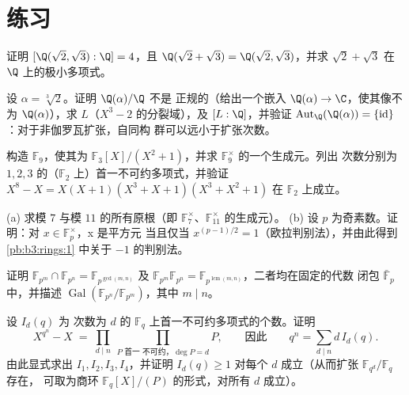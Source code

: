 \section{练习}

\begin{exercise}[$\star$]\label{exo:b3:galois:1}
证明 $[\Q(\sqrt2, \sqrt3):\Q] = 4$，且 $\Q(\sqrt2 + \sqrt3) =
\Q(\sqrt2, \sqrt3)$，并求
$\sqrt2 + \sqrt3$ 在 $\Q$ 上的极小多项式。
\end{exercise}

\begin{exercise}[$\star$]\label{exo:b3:galois:2}
设 $\alpha = \sqrt[3]2$。证明 $\Q(\alpha)/\Q$ 不是
正规的（给出一个嵌入 $\Q(\alpha) \to \C$，使其像不为
$\Q(\alpha)$），求 $L$（$X^3 -
2$ 的分裂域），及 $[L:\Q]$，并验证 $\operatorname{Aut}_\Q(\Q(\alpha)) =
\{\mathrm{id}\}$：对于非伽罗瓦扩张，自同构
群可以远小于扩张次数。
\end{exercise}

\begin{exercise}[$\star$]\label{exo:b3:galois:3}
构造 $\mathbb F_9$，使其为 $\mathbb F_3[X]/(X^2+1)$，并求
$\mathbb F_9^\times$ 的一个生成元。列出
次数分别为 $1, 2, 3$ 的（$\mathbb F_2$ 上）首一不可约多项式，并验证
$X^8 - X = X(X+1)(X^3+X+1)(X^3+X^2+1)$ 在 $\mathbb F_2$ 上成立。
\end{exercise}

\begin{exercise}[$\star\star$]\label{exo:b3:galois:4}
(a) 求模 $7$ 与模 $11$ 的所有原根（即
$\mathbb F_7^\times$、$\mathbb F_{11}^\times$ 的生成元）。
(b) 设 $p$ 为奇素数。证明：对 $x \in \mathbb F_p^\times$，x 是平方元
当且仅当 $x^{(p-1)/2} = 1$（欧拉判别法），并由此得到
\cref{pb:b3:rings:1} 中关于 $-1$ 的判别法。
\end{exercise}

\begin{exercise}[$\star\star$]\label{exo:b3:galois:5}
证明 $\mathbb F_{p^m} \cap \mathbb F_{p^n} = \mathbb
F_{p^{\gcd(m,n)}}$ 及 $\mathbb F_{p^m}\mathbb F_{p^n} = \mathbb
F_{p^{\operatorname{lcm}(m,n)}}$，二者均在固定的代数
闭包 $\bar{\mathbb F}_p$ 中，并描述
$\operatorname{Gal}(\mathbb F_{p^n}/\mathbb F_{p^m})$，其中 $m
\mid n$。
\end{exercise}

\begin{exercise}[$\star\star$]\label{exo:b3:galois:6}
设 $I_d(q)$ 为
次数为 $d$ 的 $\mathbb F_q$ 上首一不可约多项式的个数。证明
\[
X^{q^n} - X \;=\; \prod_{d \mid n}\ \prod_{P \text{ 首一
不可约，} \deg P = d} P ,
\qquad\text{因此}\qquad
q^n = \sum_{d \mid n} d\, I_d(q).
\]
由此显式求出 $I_1, I_2, I_3, I_4$，并证明 $I_d(q) \geq 1$
对每个 $d$ 成立（从而扩张 $\mathbb F_{q^d}/\mathbb F_q$ 存在，
可取为商环 $\mathbb F_q[X]/(P)$ 的形式，对所有 $d$ 成立）。
\end{exercise}

